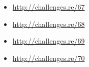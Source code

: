 \section{\Exercises}

\begin{itemize}
	\item \url{http://challenges.re/67}
	\item \url{http://challenges.re/68}
	\item \url{http://challenges.re/69}
	\item \url{http://challenges.re/70}
\end{itemize}

